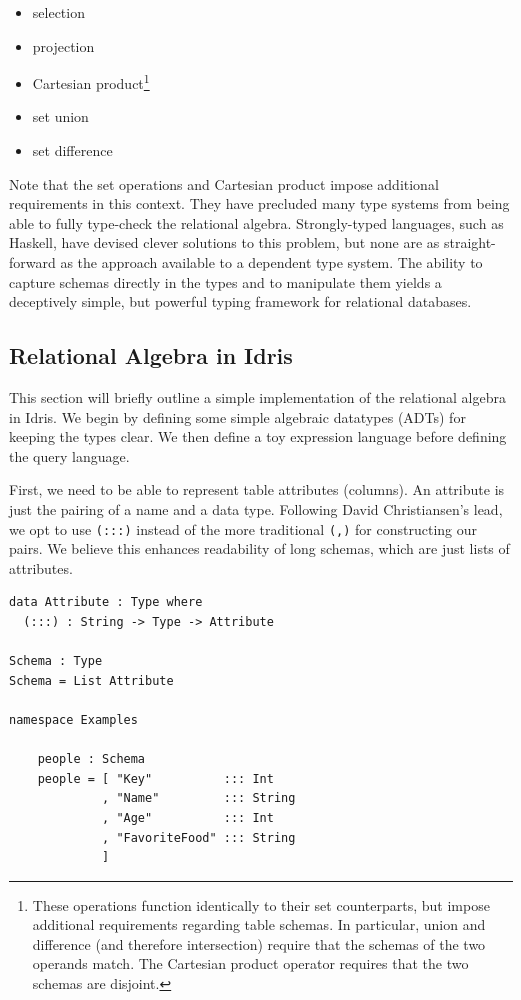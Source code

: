\documentclass[12pt]{article}
\begin{document}
\begin{itemize}
    \item selection
    \item projection
    \item Cartesian product\footnote{\label{fn:set_ops} These operations function identically to their set counterparts, but impose additional requirements regarding table schemas. In particular, union and difference (and therefore intersection) require that the schemas of the two operands match. The Cartesian product operator requires that the two schemas are disjoint.}
    \item set union\footnotemark[\ref{fn:set_ops}]
    \item set difference\footnotemark[\ref{fn:set_ops}]
\end{itemize}

Note that the set operations and Cartesian product impose additional requirements in this context.
They have precluded many type systems from being able to fully type-check the relational algebra.
Strongly-typed languages, such as Haskell, have devised clever solutions to this problem, but none are as straight-forward as the approach available to a dependent type system.
The ability to capture schemas directly in the types and to manipulate them yields a deceptively simple, but powerful typing framework for relational databases.

\subsection{Relational Algebra in Idris}

This section will briefly outline a simple implementation of the relational algebra in Idris.
We begin by defining some simple algebraic datatypes (ADTs) for keeping the types clear.
We then define a toy expression language before defining the query language.

First, we need to be able to represent table attributes (columns).
An attribute is just the pairing of a name and a data type.
Following David Christiansen's lead, we opt to use \texttt{(:::)} instead of the more traditional \texttt{(,)} for constructing our pairs.
We believe this enhances readability of long schemas, which are just lists of attributes.

\begin{lstlisting}
data Attribute : Type where
  (:::) : String -> Type -> Attribute

Schema : Type
Schema = List Attribute

namespace Examples

    people : Schema
    people = [ "Key"          ::: Int 
             , "Name"         ::: String
             , "Age"          ::: Int
             , "FavoriteFood" ::: String
             ]
\end{lstlisting}
\end{document}
